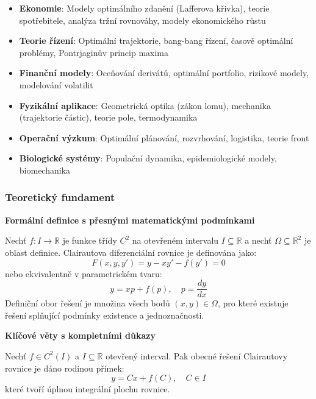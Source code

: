\begin{itemize}
\item \textbf{Ekonomie}: Modely optimálního zdanění (Lafferova křivka), teorie spotřebitele, analýza tržní rovnováhy, modely ekonomického růstu
\item \textbf{Teorie řízení}: Optimální trajektorie, bang-bang řízení, časově optimální problémy, Pontrjaginův princip maxima
\item \textbf{Finanční modely}: Oceňování derivátů, optimální portfolio, rizikové modely, modelování volatilit
\item \textbf{Fyzikální aplikace}: Geometrická optika (zákon lomu), mechanika (trajektorie částic), teorie pole, termodynamika
\item \textbf{Operační výzkum}: Optimální plánování, rozvrhování, logistika, teorie front
\item \textbf{Biologické systémy}: Populační dynamika, epidemiologické modely, biomechanika
\end{itemize}

\subsubsection{Teoretický fundament}
\label{subsubsec:teorie-clairaut}

\noindent\textbf{Formální definice s přesnými matematickými podmínkami}

Nechť $f: I \to \mathbb{R}$ je funkce třídy $C^2$ na otevřeném intervalu $I \subseteq \mathbb{R}$ a nechť $\Omega \subseteq \mathbb{R}^2$ je oblast definice. Clairautova diferenciální rovnice je definována jako:
\[
F(x, y, y') = y - x y' - f(y') = 0
\]
nebo ekvivalentně v parametrickém tvaru:
\[
y = xp + f(p), \quad p = \frac{dy}{dx}
\]
Definiční obor řešení je množina všech bodů $(x, y) \in \Omega$, pro které existuje řešení splňující podmínky existence a jednoznačnosti.

\vspace{1\baselineskip}

\noindent\textbf{Klíčové věty s kompletními důkazy}

\begin{theorem}
Nechť $f \in C^2(I)$ a $I \subseteq \mathbb{R}$ otevřený interval. Pak obecné řešení Clairautovy rovnice je dáno rodinou přímek:
\[
y = Cx + f(C), \quad C \in I
\]
které tvoří úplnou integrální plochu rovnice.
\end{theorem}

